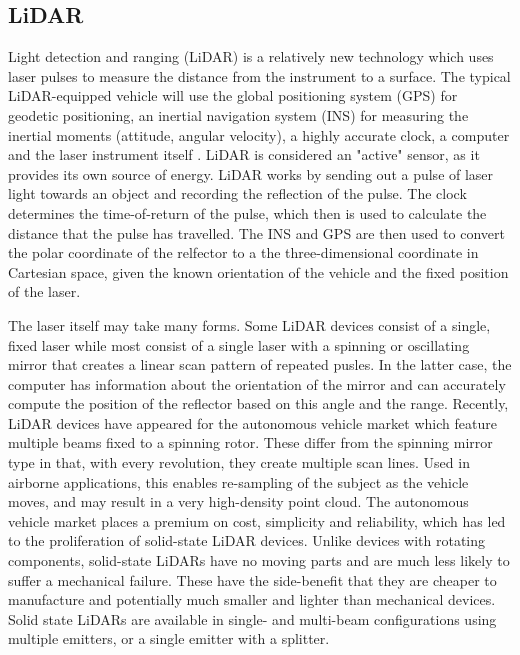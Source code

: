 \documentclass[10pt,a4paper]{report}
\begin{document}
\subsection{LiDAR}

Light detection and ranging (LiDAR) is a relatively new technology which uses laser pulses to measure the distance from the instrument to a surface. The typical LiDAR-equipped vehicle will use the global positioning system (GPS) for geodetic positioning, an inertial navigation system (INS) for measuring the inertial moments (attitude, angular velocity), a highly accurate clock, a computer and the laser instrument itself \cite{May2007,Lillesand1999}. LiDAR is considered an "active" sensor, as it provides its own source of energy. LiDAR works by sending out a pulse of laser light towards an object and recording the reflection of the pulse. The clock determines the time-of-return of the pulse, which then is used to calculate the distance that the pulse has travelled. The INS and GPS are then used to convert the polar coordinate of the relfector to a the three-dimensional coordinate in Cartesian space, given the known orientation of the vehicle and the fixed position of the laser. 

The laser itself may take many forms. Some LiDAR devices consist of a single, fixed laser while most consist of a single laser with a spinning or oscillating mirror that creates a linear scan pattern of repeated pusles. In the latter case, the computer has information about the orientation of the mirror and can accurately compute the position of the reflector based on this angle and the range. Recently, LiDAR devices have appeared for the autonomous vehicle market which feature multiple beams fixed to a spinning rotor. These differ from the spinning mirror type in that, with every revolution, they create multiple scan lines. Used in airborne applications, this enables re-sampling of the subject as the vehicle moves, and may result in a very high-density point cloud. The autonomous vehicle market places a premium on cost, simplicity and reliability, which has led to the proliferation of solid-state LiDAR devices. Unlike devices with rotating components, solid-state LiDARs have no moving parts and are much less likely to suffer a mechanical failure. These have the side-benefit that they are cheaper to manufacture and potentially much smaller and lighter than mechanical devices. Solid state LiDARs are available in single- and multi-beam configurations using multiple emitters, or a single emitter with a splitter.
\end{document}
